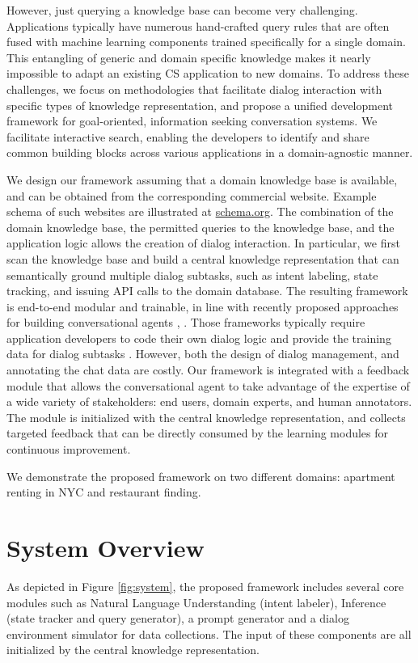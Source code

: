 \documentclass[letterpaper]{article} %
\begin{document}
However, just querying a knowledge base can become very challenging. %
Applications typically have numerous hand-crafted query rules that are often fused with machine learning components trained specifically for a single domain. This entangling of generic and domain specific knowledge makes it nearly impossible to adapt an existing CS application to new domains.
To address these challenges, we focus on methodologies that facilitate dialog interaction with specific types of knowledge representation, and propose a unified development framework for goal-oriented, information seeking conversation systems.
We facilitate interactive search, enabling the developers to identify and share common building blocks across various applications in a domain-agnostic manner.


We design our framework assuming that a domain knowledge base is available, and can be obtained from the corresponding commercial website. Example schema of such websites are illustrated at \url{schema.org}. The combination of the domain knowledge base, the permitted queries to the knowledge base, and the application logic
allows the creation of dialog interaction. In particular, we first scan the knowledge base and build a central knowledge representation that can semantically ground multiple dialog subtasks, such as intent labeling, state tracking, and issuing API calls to the domain database. The resulting framework is end-to-end modular and trainable, in line with recently proposed approaches for building conversational agents \cite{rasa}, \cite{truong2017maca}. Those frameworks typically require application developers to code their own dialog logic and provide the training data for dialog subtasks \cite{rasa}. However, both the design of dialog management, and annotating the chat data are costly. Our framework is integrated with a feedback module that allows the conversational agent to take advantage of the expertise of a wide variety of stakeholders: end users,  domain experts, and human annotators. The module is initialized with the central knowledge representation, and collects targeted feedback that can be directly consumed by the learning modules
for continuous improvement.

We demonstrate the proposed framework on two different domains: apartment renting in NYC and restaurant finding.

\section{System Overview}
As depicted in Figure \ref{fig:system}, the proposed framework includes several core modules such as Natural Language Understanding (intent labeler), Inference (state tracker and query generator), a prompt generator and a dialog environment simulator for data collections. The input of these components are all initialized by the central knowledge representation.
\end{document}
